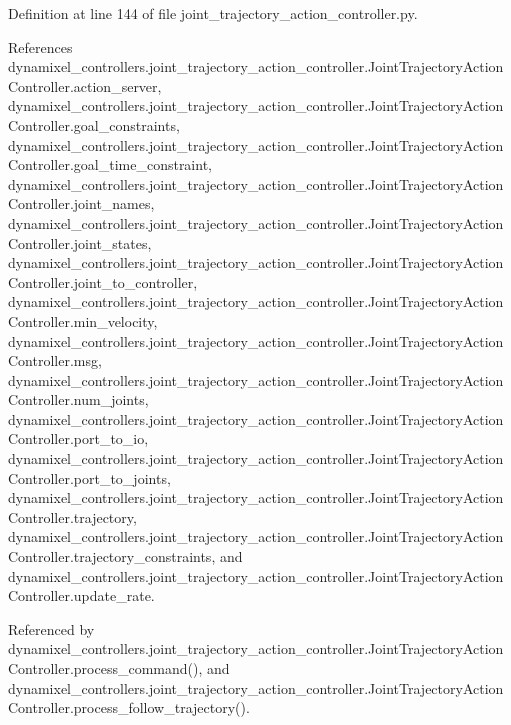 Definition at line 144 of file joint\+\_\+trajectory\+\_\+action\+\_\+controller.\+py.



References dynamixel\+\_\+controllers.\+joint\+\_\+trajectory\+\_\+action\+\_\+controller.\+Joint\+Trajectory\+Action\+Controller.\+action\+\_\+server, dynamixel\+\_\+controllers.\+joint\+\_\+trajectory\+\_\+action\+\_\+controller.\+Joint\+Trajectory\+Action\+Controller.\+goal\+\_\+constraints, dynamixel\+\_\+controllers.\+joint\+\_\+trajectory\+\_\+action\+\_\+controller.\+Joint\+Trajectory\+Action\+Controller.\+goal\+\_\+time\+\_\+constraint, dynamixel\+\_\+controllers.\+joint\+\_\+trajectory\+\_\+action\+\_\+controller.\+Joint\+Trajectory\+Action\+Controller.\+joint\+\_\+names, dynamixel\+\_\+controllers.\+joint\+\_\+trajectory\+\_\+action\+\_\+controller.\+Joint\+Trajectory\+Action\+Controller.\+joint\+\_\+states, dynamixel\+\_\+controllers.\+joint\+\_\+trajectory\+\_\+action\+\_\+controller.\+Joint\+Trajectory\+Action\+Controller.\+joint\+\_\+to\+\_\+controller, dynamixel\+\_\+controllers.\+joint\+\_\+trajectory\+\_\+action\+\_\+controller.\+Joint\+Trajectory\+Action\+Controller.\+min\+\_\+velocity, dynamixel\+\_\+controllers.\+joint\+\_\+trajectory\+\_\+action\+\_\+controller.\+Joint\+Trajectory\+Action\+Controller.\+msg, dynamixel\+\_\+controllers.\+joint\+\_\+trajectory\+\_\+action\+\_\+controller.\+Joint\+Trajectory\+Action\+Controller.\+num\+\_\+joints, dynamixel\+\_\+controllers.\+joint\+\_\+trajectory\+\_\+action\+\_\+controller.\+Joint\+Trajectory\+Action\+Controller.\+port\+\_\+to\+\_\+io, dynamixel\+\_\+controllers.\+joint\+\_\+trajectory\+\_\+action\+\_\+controller.\+Joint\+Trajectory\+Action\+Controller.\+port\+\_\+to\+\_\+joints, dynamixel\+\_\+controllers.\+joint\+\_\+trajectory\+\_\+action\+\_\+controller.\+Joint\+Trajectory\+Action\+Controller.\+trajectory, dynamixel\+\_\+controllers.\+joint\+\_\+trajectory\+\_\+action\+\_\+controller.\+Joint\+Trajectory\+Action\+Controller.\+trajectory\+\_\+constraints, and dynamixel\+\_\+controllers.\+joint\+\_\+trajectory\+\_\+action\+\_\+controller.\+Joint\+Trajectory\+Action\+Controller.\+update\+\_\+rate.



Referenced by dynamixel\+\_\+controllers.\+joint\+\_\+trajectory\+\_\+action\+\_\+controller.\+Joint\+Trajectory\+Action\+Controller.\+process\+\_\+command(), and dynamixel\+\_\+controllers.\+joint\+\_\+trajectory\+\_\+action\+\_\+controller.\+Joint\+Trajectory\+Action\+Controller.\+process\+\_\+follow\+\_\+trajectory().



